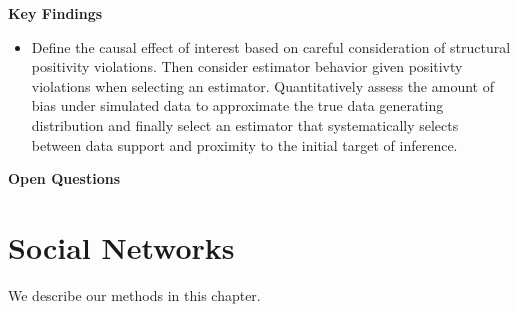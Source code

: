 \documentclass[
]{book}
\providecommand{\tightlist}{%
  \setlength{\itemsep}{0pt}\setlength{\parskip}{0pt}}
\begin{document}
\textbf{Key Findings}

\begin{itemize}
\tightlist
\item
  Define the causal effect of interest based on careful consideration of structural positivity violations. Then consider estimator behavior given positivty violations when selecting an estimator. Quantitatively assess the amount of bias under simulated data to approximate the true data generating distribution and finally select an estimator that systematically selects between data support and proximity to the initial target of inference.
\end{itemize}

\textbf{Open Questions}

\hypertarget{social-networks}{%
\chapter{Social Networks}\label{social-networks}}

We describe our methods in this chapter.

  
\end{document}
